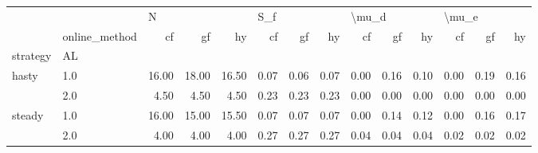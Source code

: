 \begin{tabular}{llrrrrrrrrrrrr}
\toprule
       & {} & \multicolumn{3}{l}{N} & \multicolumn{3}{l}{S\_f} & \multicolumn{3}{l}{\textbackslash mu\_d} & \multicolumn{3}{l}{\textbackslash mu\_e} \\
       & online\_method &    cf &    gf &    hy &   cf &   gf &   hy &    cf &   gf &   hy &    cf &   gf &   hy \\
strategy & AL &       &       &       &      &      &      &       &      &      &       &      &      \\
\midrule
hasty & 1.0 & 16.00 & 18.00 & 16.50 & 0.07 & 0.06 & 0.07 &  0.00 & 0.16 & 0.10 &  0.00 & 0.19 & 0.16 \\
       & 2.0 &  4.50 &  4.50 &  4.50 & 0.23 & 0.23 & 0.23 &  0.00 & 0.00 & 0.00 &  0.00 & 0.00 & 0.00 \\
steady & 1.0 & 16.00 & 15.00 & 15.50 & 0.07 & 0.07 & 0.07 &  0.00 & 0.14 & 0.12 &  0.00 & 0.16 & 0.17 \\
       & 2.0 &  4.00 &  4.00 &  4.00 & 0.27 & 0.27 & 0.27 &  0.04 & 0.04 & 0.04 &  0.02 & 0.02 & 0.02 \\
\bottomrule
\end{tabular}
